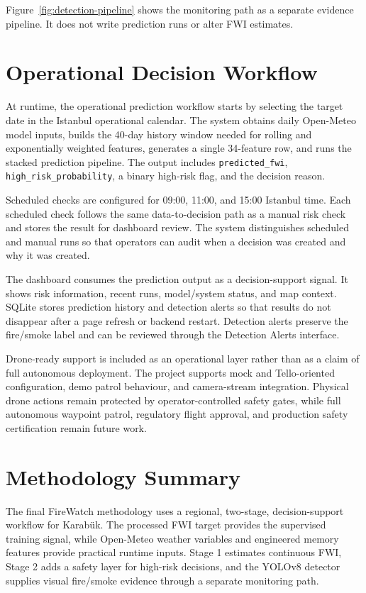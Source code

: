 Figure~\ref{fig:detection-pipeline} shows the monitoring path as a separate
evidence pipeline. It does not write prediction runs or alter FWI estimates.

\section{Operational Decision Workflow}

At runtime, the operational prediction workflow starts by selecting the target
date in the Istanbul operational calendar. The system obtains daily
Open-Meteo model inputs, builds the 40-day history window needed for rolling
and exponentially weighted features, generates a single 34-feature row, and
runs the stacked prediction pipeline. The output includes
\texttt{predicted\_fwi}, \texttt{high\_risk\_probability}, a binary high-risk
flag, and the decision reason.

Scheduled checks are configured for 09:00, 11:00, and 15:00 Istanbul time.
Each scheduled check follows the same data-to-decision path as a manual risk
check and stores the result for dashboard review. The system distinguishes
scheduled and manual runs so that operators can audit when a decision was
created and why it was created.

The dashboard consumes the prediction output as a decision-support signal. It
shows risk information, recent runs, model/system status, and map context.
SQLite stores prediction history and detection alerts so that results do not
disappear after a page refresh or backend restart. Detection alerts preserve
the fire/smoke label and can be reviewed through the Detection Alerts
interface.

Drone-ready support is included as an operational layer rather than as a claim
of full autonomous deployment. The project supports mock and Tello-oriented
configuration, demo patrol behaviour, and camera-stream integration. Physical
drone actions remain protected by operator-controlled safety gates, while full
autonomous waypoint patrol, regulatory flight approval, and production safety
certification remain future work.

\section{Methodology Summary}

The final FireWatch methodology uses a regional, two-stage, decision-support
workflow for Karabük. The processed FWI target provides the supervised
training signal, while Open-Meteo weather variables and engineered memory
features provide practical runtime inputs. Stage 1 estimates continuous FWI,
Stage 2 adds a safety layer for high-risk decisions, and the YOLOv8 detector
supplies visual fire/smoke evidence through a separate monitoring path.
